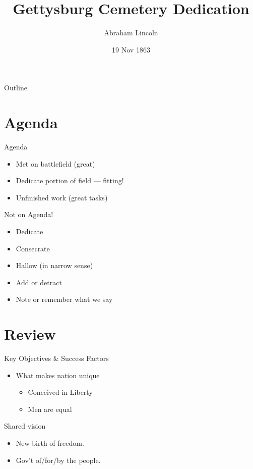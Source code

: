 \documentclass{beamer}
\title{Gettysburg Cemetery Dedication}
\author{Abraham Lincoln}
\institute{United States of America}
\date{19 Nov 1863}
\begin{document}
\begin{frame}
  \titlepage
\end{frame}

\begin{frame}{Outline}
  \tableofcontents
\end{frame}

\section{Agenda}

\begin{frame}{Agenda}

\begin{itemize}
  \item Met on battlefield (great)
  \item Dedicate portion of field --- fitting!
  \item Unfinished work (great tasks)
\end{itemize}

\end{frame}

\begin{frame}{Not on Agenda!}

\begin{itemize}[<+->]
  \item Dedicate
  \item Consecrate
  \item Hallow (in narrow sense)
  \item Add or detract
  \item Note or remember what we say
\end{itemize}

\end{frame}

\section{Review}

\begin{frame}{Key Objectives \& Success Factors}

\begin{itemize}
\item What makes nation unique
  \begin{itemize}
    \item Conceived in Liberty
    \item Men are equal
  \end{itemize}
\end{itemize}

\begin{block}{Shared vision}
\begin{itemize}
\item New birth of freedom.
\item Gov't of/for/by the people.
\end{itemize}
\end{block}

\end{frame}
\end{document}
